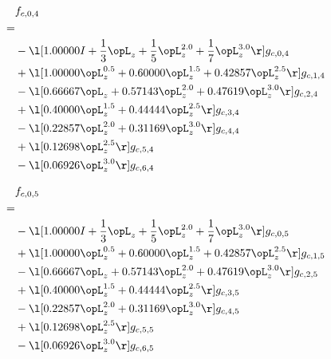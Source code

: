 \begin{alignat}{2} 
\label{eq:f_04_0} 
& f_{c,0,4} \nonumber \\ 
 = \\ 
& - \l[  1.00000 I + \frac{1}{3} \opL_z + \frac{1}{5} \opL_z^{2.0} + \frac{1}{7} \opL_z^{3.0}  \r] g_{c,0,4} \nonumber \\ 
& + \l[  1.00000 \opL_z^{0.5} +  0.60000 \opL_z^{1.5} +  0.42857 \opL_z^{2.5}  \r] g_{c,1,4} \nonumber \\ 
& - \l[  0.66667 \opL_z +  0.57143 \opL_z^{2.0} +  0.47619 \opL_z^{3.0}  \r] g_{c,2,4} \nonumber \\ 
& + \l[  0.40000 \opL_z^{1.5} +  0.44444 \opL_z^{2.5}  \r] g_{c,3,4} \nonumber \\ 
& - \l[  0.22857 \opL_z^{2.0} +  0.31169 \opL_z^{3.0}  \r] g_{c,4,4} \nonumber \\ 
& + \l[  0.12698 \opL_z^{2.5}  \r] g_{c,5,4} \nonumber \\ 
& - \l[  0.06926 \opL_z^{3.0}  \r] g_{c,6,4} \nonumber \\ 
\end{alignat} 


\begin{alignat}{2} 
\label{eq:f_05_0} 
& f_{c,0,5} \nonumber \\ 
 = \\ 
& - \l[  1.00000 I + \frac{1}{3} \opL_z + \frac{1}{5} \opL_z^{2.0} + \frac{1}{7} \opL_z^{3.0}  \r] g_{c,0,5} \nonumber \\ 
& + \l[  1.00000 \opL_z^{0.5} +  0.60000 \opL_z^{1.5} +  0.42857 \opL_z^{2.5}  \r] g_{c,1,5} \nonumber \\ 
& - \l[  0.66667 \opL_z +  0.57143 \opL_z^{2.0} +  0.47619 \opL_z^{3.0}  \r] g_{c,2,5} \nonumber \\ 
& + \l[  0.40000 \opL_z^{1.5} +  0.44444 \opL_z^{2.5}  \r] g_{c,3,5} \nonumber \\ 
& - \l[  0.22857 \opL_z^{2.0} +  0.31169 \opL_z^{3.0}  \r] g_{c,4,5} \nonumber \\ 
& + \l[  0.12698 \opL_z^{2.5}  \r] g_{c,5,5} \nonumber \\ 
& - \l[  0.06926 \opL_z^{3.0}  \r] g_{c,6,5} \nonumber \\ 
\end{alignat} 


